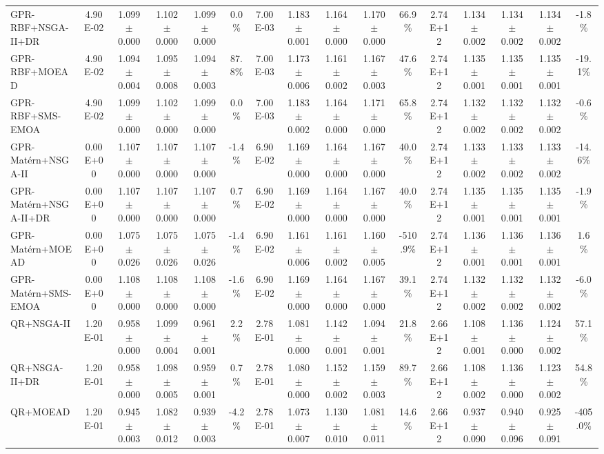 \begin{table}[htbp]
{\begin{tabular}{l c c c c c c c c c c c c c c c}
GPR-RBF+NSGA-II+DR & 4.90E-02 & 1.099$\pm$0.000 & 1.102$\pm$0.000 & 1.099$\pm$0.000 & 0.0\% & 7.00E-03 & 1.183$\pm$0.001 & 1.164$\pm$0.000 & 1.170$\pm$0.000 & 66.9\% & 2.74E+12 & 1.134$\pm$0.002 & 1.134$\pm$0.002 & 1.134$\pm$0.002 & -1.8\% \\
GPR-RBF+MOEAD & 4.90E-02 & 1.094$\pm$0.004 & 1.095$\pm$0.008 & 1.094$\pm$0.003 & 87.8\% & 7.00E-03 & 1.173$\pm$0.006 & 1.161$\pm$0.002 & 1.167$\pm$0.003 & 47.6\% & 2.74E+12 & 1.135$\pm$0.001 & 1.135$\pm$0.001 & 1.135$\pm$0.001 & -19.1\% \\
GPR-RBF+SMS-EMOA & 4.90E-02 & 1.099$\pm$0.000 & 1.102$\pm$0.000 & 1.099$\pm$0.000 & 0.0\% & 7.00E-03 & 1.183$\pm$0.002 & 1.164$\pm$0.000 & 1.171$\pm$0.000 & 65.8\% & 2.74E+12 & 1.132$\pm$0.002 & 1.132$\pm$0.002 & 1.132$\pm$0.002 & -0.6\% \\
GPR-Mat\'ern+NSGA-II & 0.00E+00 & 1.107$\pm$0.000 & 1.107$\pm$0.000 & 1.107$\pm$0.000 & -1.4\% & 6.90E-02 & 1.169$\pm$0.000 & 1.164$\pm$0.000 & 1.167$\pm$0.000 & 40.0\% & 2.74E+12 & 1.133$\pm$0.002 & 1.133$\pm$0.002 & 1.133$\pm$0.002 & -14.6\% \\
GPR-Mat\'ern+NSGA-II+DR & 0.00E+00 & 1.107$\pm$0.000 & 1.107$\pm$0.000 & 1.107$\pm$0.000 & 0.7\% & 6.90E-02 & 1.169$\pm$0.000 & 1.164$\pm$0.000 & 1.167$\pm$0.000 & 40.0\% & 2.74E+12 & 1.135$\pm$0.001 & 1.135$\pm$0.001 & 1.135$\pm$0.001 & -1.9\% \\
GPR-Mat\'ern+MOEAD & 0.00E+00 & 1.075$\pm$0.026 & 1.075$\pm$0.026 & 1.075$\pm$0.026 & -1.4\% & 6.90E-02 & 1.161$\pm$0.006 & 1.161$\pm$0.002 & 1.160$\pm$0.005 & -510.9\% & 2.74E+12 & 1.136$\pm$0.001 & 1.136$\pm$0.001 & 1.136$\pm$0.001 & 1.6\% \\
GPR-Mat\'ern+SMS-EMOA & 0.00E+00 & 1.108$\pm$0.000 & 1.108$\pm$0.000 & 1.108$\pm$0.000 & -1.6\% & 6.90E-02 & 1.169$\pm$0.000 & 1.164$\pm$0.000 & 1.167$\pm$0.000 & 39.1\% & 2.74E+12 & 1.132$\pm$0.002 & 1.132$\pm$0.002 & 1.132$\pm$0.002 & -6.0\% \\
QR+NSGA-II & 1.20E-01 & 0.958$\pm$0.000 & 1.099$\pm$0.004 & 0.961$\pm$0.001 & 2.2\% & 2.78E-01 & 1.081$\pm$0.000 & 1.142$\pm$0.001 & 1.094$\pm$0.001 & 21.8\% & 2.66E+12 & 1.108$\pm$0.001 & 1.136$\pm$0.000 & 1.124$\pm$0.002 & 57.1\% \\
QR+NSGA-II+DR & 1.20E-01 & 0.958$\pm$0.000 & 1.098$\pm$0.005 & 0.959$\pm$0.001 & 0.7\% & 2.78E-01 & 1.080$\pm$0.000 & 1.152$\pm$0.002 & 1.159$\pm$0.003 & 89.7\% & 2.66E+12 & 1.108$\pm$0.002 & 1.136$\pm$0.000 & 1.123$\pm$0.002 & 54.8\% \\
QR+MOEAD & 1.20E-01 & 0.945$\pm$0.003 & 1.082$\pm$0.012 & 0.939$\pm$0.003 & -4.2\% & 2.78E-01 & 1.073$\pm$0.007 & 1.130$\pm$0.010 & 1.081$\pm$0.011 & 14.6\% & 2.66E+12 & 0.937$\pm$0.090 & 0.940$\pm$0.096 & 0.925$\pm$0.091 & -405.0\% \\

\end{tabular}}
\end{table}
